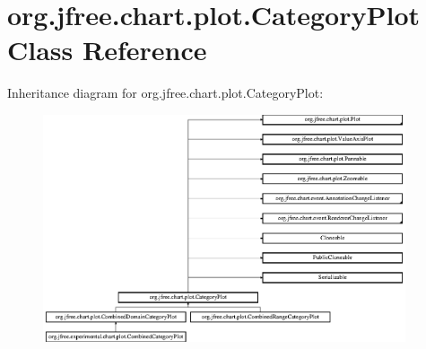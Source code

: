\hypertarget{classorg_1_1jfree_1_1chart_1_1plot_1_1_category_plot}{}\section{org.\+jfree.\+chart.\+plot.\+Category\+Plot Class Reference}
\label{classorg_1_1jfree_1_1chart_1_1plot_1_1_category_plot}
Inheritance diagram for org.\+jfree.\+chart.\+plot.\+Category\+Plot\+:\begin{figure}[H]
\begin{center}
\leavevmode
\includegraphics[height=6.706587cm]{classorg_1_1jfree_1_1chart_1_1plot_1_1_category_plot}
\end{center}
\end{figure}
